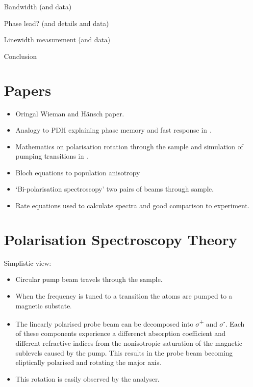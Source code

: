 \documentclass{article}
\begin{document}
\begin{multicols}{2}
{\color{red}Bandwidth (and data)}

{\color{red}Phase lead? (and details and data)}

{\color{red}Linewidth measurement (and data)}

{\color{red}Conclusion}

\section{Papers}
\begin{itemize}
    \item Oringal Wieman and H\"ansch paper\cite{wieman_doppler-free_1976}.
    \item Analogy to PDH explaining phase memory and fast response in \cite{torii_laser-phase_2012}.
    \item Mathematics on polarisation rotation through the sample and simulation of pumping transitions in \cite{pearman_polarization_2002}.
    \item Bloch equations to population anisotropy\cite{harris_polarization_2006}
    \item `Bi-polarisation spectroscopy' two pairs of beams through sample\cite{tiwari_laser_2006}.
    \item Rate equations used to calculate spectra and good comparison to experiment\cite{do_polarization_2008}.
\end{itemize}


\section{Polarisation Spectroscopy Theory}

Simplistic view:
\begin{itemize}
    \item Circular pump beam travels through the sample.
    \item When the frequency is tuned to a transition the atoms are pumped to a magnetic substate.
    \item The linearly polarised probe beam can be decomposed into $\sigma$\textsuperscript{+} and $\sigma$\textsuperscript{-}. Each of these components experience a differenct absorption coefficient and different refractive indices from the nonisotropic saturation of the magnetic sublevels caused by the pump. This results in the probe beam becoming eliptically polarised and rotating the major axis.
    \item This rotation is easily observed by the analyser.
\end{itemize}


\end{multicols}
\end{document}
